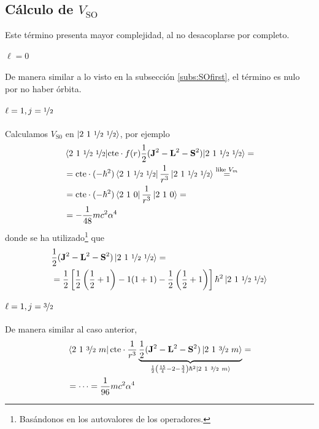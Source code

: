 \subsection{Cálculo de $V_\text{SO}$}
Este término presenta mayor complejidad, al no desacoplarse por completo.

\paragraph{$\ell=0$}
De manera similar a lo visto en la subsección \ref{subs:SOfirst}, el término es nulo
por no haber órbita.

\paragraph{$\ell=1,j={\nicefrac{1}{2}}$}


Calculamos $V_\text{S0}$ en $\ket{2\ 1\  {\nicefrac{1}{2}} \ {\nicefrac{1}{2}}}$, por ejemplo
\begin{equation}
  \begin{split}
    &\ev{\text{cte}\cdot f(r) \frac{1}{2}
      (\boldrm{J}^2 -\boldrm{L}^2 -\boldrm{S}^2)  }{2\ 1\  \oh \  \oh}= \\
    &= \text{cte}\cdot (-\hbar^2) \bra{2\ 1\ \oh \ \oh}
    \frac{1}{r^3} \ket{2\ 1 \ \oh \ \oh} \stackrel{\text{like }V_m}{=}
    \\ &= \text{cte}\cdot(-\hbar^2)
    \bra{2\ 1\ 0}\frac{1}{r^3}\ket{2\ 1\ 0} = \\ &= - \frac{1}{48}mc^2\alpha^4
  \end{split}
\end{equation}
donde se ha utilizado\footnote{Basándonos en los autovalores de los operadores.} que
\begin{equation}
  \begin{split}
    &\frac{1}{2} (\boldrm{J}^2 -\boldrm{L}^2 -\boldrm{S}^2) \ket{2\ 1\
      \oh \ \oh} = \\ &= \frac{1}{2} \left[ \frac{1}{2} \left( \frac{1}{2}
        +1 \right) - 1(1+1)-\frac{1}{2}\left( \frac{1}{2}+1 \right)
    \right] \hbar^2 \ket{2\ 1\ \oh \ \oh}
  \end{split}
\end{equation}



\paragraph{$\ell=1,j=\nicefrac{3}{2}$}
De manera similar al caso anterior,
\begin{equation}
  \begin{split}
    &\bra{2\ 1\  \nicefrac{3}{2}\ m} \text{cte}\cdot \frac{1}{r^3}
    \underbrace{\frac{1}{2} (\boldrm{J}^2 - \boldrm{L}^2 -
      \boldrm{S}^2) \ket{ 2\ 1\  \nicefrac{3}{2}\ m}}_{\frac{1}{2}\left(
        \frac{15}{4}-2-\frac{3}{4} \right)\hbar^2 \ket{2\ 1\ 
        \nicefrac{3}{2}\ m}}= \\ &=  \cdots  = \frac{1}{96}mc^2 \alpha^4
\end{split}
\end{equation}

